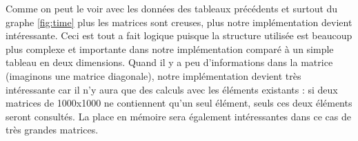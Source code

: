 \documentclass[a4paper]{scrartcl}
\begin{document}
Comme on peut le voir avec les données des tableaux précédents et surtout du graphe \ref{fig:time} plus les matrices sont creuses, plus notre implémentation devient intéressante. Ceci est tout a fait logique puisque la structure utilisée est beaucoup plus complexe et importante dans notre implémentation comparé à un simple tableau en deux dimensions. Quand il y a peu d'informations dans la matrice (imaginons une matrice diagonale), notre implémentation devient très intéressante car il n'y aura que des calculs avec les éléments existants : si deux matrices de 1000x1000 ne contiennent qu'un seul élément, seuls ces deux éléments seront consultés. La place en mémoire sera également intéressantes dans ce cas de très grandes matrices.
\end{document}

